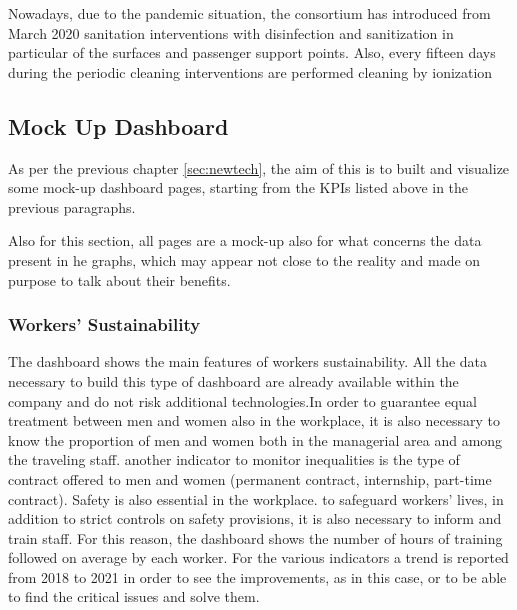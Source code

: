 Nowadays, due to the pandemic situation, the consortium has introduced from March 2020 sanitation interventions with disinfection and sanitization in particular of the surfaces and passenger support points. Also, every fifteen days during the periodic cleaning interventions are performed cleaning by ionization

\subsection{Mock Up Dashboard}
As per the previous chapter \ref{sec:newtech}, the aim of this is to built and visualize some mock-up dashboard pages, starting from the KPIs listed above in the previous paragraphs.

Also for this section, all pages are a mock-up also for what concerns the data present in he graphs, which may appear not close to the reality and made on purpose to talk about their benefits.

\newpage

\newpage
\begin{landscape}
\thispagestyle{empty}

\end{landscape}

\subsubsection{Workers' Sustainability}
The dashboard shows the main features of workers sustainability. All the data necessary to build this type of dashboard are already available within the company and do not risk additional technologies.In order to guarantee equal treatment between men and women also in the workplace, it is also necessary to know the proportion of men and women both in the managerial area and among the traveling staff.
another indicator to monitor inequalities is the type of contract offered to men and women (permanent contract, internship, part-time contract).
Safety is also essential in the workplace. to safeguard workers' lives, in addition to strict controls on safety provisions, it is also necessary to inform and train staff. For this reason, the dashboard shows the number of hours of training followed on average by each worker. For the various indicators a trend is reported from 2018 to 2021 in order to see the improvements, as in this case, or to be able to find the critical issues and solve them.


